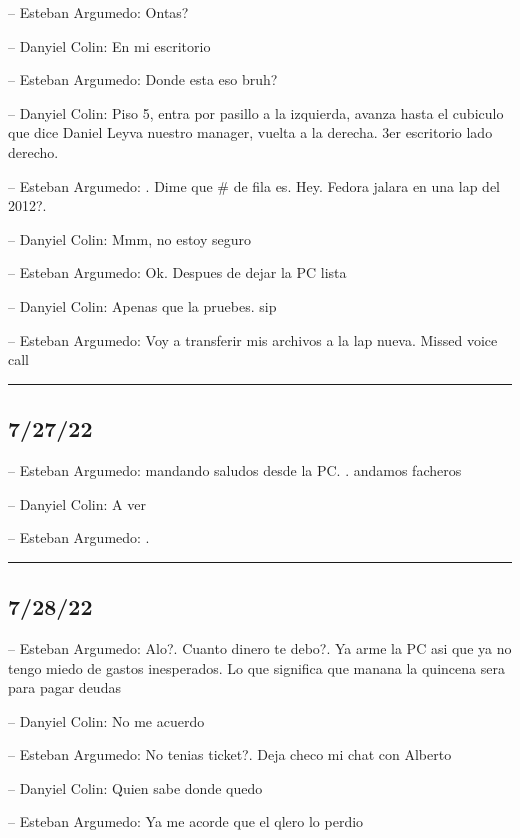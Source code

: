 -- Esteban Argumedo: Ontas?

-- Danyiel Colin: En mi escritorio

-- Esteban Argumedo: Donde esta eso bruh?

-- Danyiel Colin: Piso 5, entra por pasillo a la izquierda, avanza hasta
el cubiculo que dice Daniel Leyva nuestro manager, vuelta a la derecha.
3er escritorio lado derecho.

-- Esteban Argumedo: . Dime que \# de fila es. Hey. Fedora jalara en una
lap del 2012?.

-- Danyiel Colin: Mmm, no estoy seguro

-- Esteban Argumedo: Ok. Despues de dejar la PC lista

-- Danyiel Colin: Apenas que la pruebes. sip

-- Esteban Argumedo: Voy a transferir mis archivos a la lap nueva.
Missed voice call

\begin{center}\rule{0.5\linewidth}{0.5pt}\end{center}

\hypertarget{section-133}{%
\subsection{7/27/22}\label{section-133}}

-- Esteban Argumedo: mandando saludos desde la PC. . andamos facheros

-- Danyiel Colin: A ver

-- Esteban Argumedo: .

\begin{center}\rule{0.5\linewidth}{0.5pt}\end{center}

\hypertarget{section-134}{%
\subsection{7/28/22}\label{section-134}}

-- Esteban Argumedo: Alo?. Cuanto dinero te debo?. Ya arme la PC asi que
ya no tengo miedo de gastos inesperados. Lo que significa que manana la
quincena sera para pagar deudas

-- Danyiel Colin: No me acuerdo

-- Esteban Argumedo: No tenias ticket?. Deja checo mi chat con Alberto

-- Danyiel Colin: Quien sabe donde quedo

-- Esteban Argumedo: Ya me acorde que el qlero lo perdio


